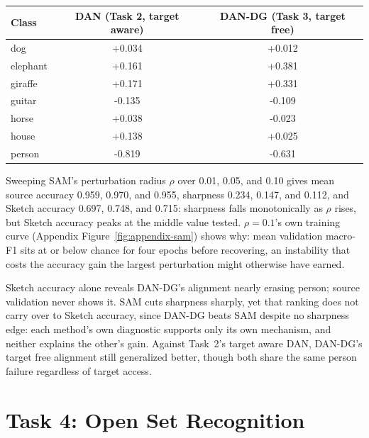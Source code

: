 \documentclass{article}
\begin{document}
\begin{center}
\small
\begin{tabular}{lcc}
  \toprule
  Class & DAN (Task 2, target aware) & DAN-DG (Task 3, target free) \\
  \midrule
  dog      & +0.034 & +0.012 \\
  elephant & +0.161 & +0.381 \\
  giraffe  & +0.171 & +0.331 \\
  guitar   & -0.135 & -0.109 \\
  horse    & +0.038 & -0.023 \\
  house    & +0.138 & +0.025 \\
  person   & -0.819 & -0.631 \\
  \bottomrule
\end{tabular}
\label{tab:crosstask-dan}
\end{center}

Sweeping SAM's perturbation radius $\rho$ over 0.01, 0.05, and 0.10 gives
mean source accuracy 0.959, 0.970, and 0.955, sharpness 0.234, 0.147, and
0.112, and Sketch accuracy 0.697, 0.748, and 0.715: sharpness falls
monotonically as $\rho$ rises, but Sketch accuracy peaks at the middle
value tested. $\rho=0.1$'s own training curve (Appendix
Figure~\ref{fig:appendix-sam}) shows why: mean validation macro-F1 sits at
or below chance for four epochs before recovering, an instability that
costs the accuracy gain the largest perturbation might otherwise have
earned.

Sketch accuracy alone reveals DAN-DG's alignment nearly erasing person;
source validation never shows it. SAM cuts sharpness sharply, yet that
ranking does not carry over to Sketch accuracy, since DAN-DG beats SAM
despite no sharpness edge: each method's own diagnostic supports only its
own mechanism, and neither explains the other's gain. Against Task~2's
target aware DAN, DAN-DG's target free alignment still generalized better,
though both share the
same person failure regardless of target access.

\section{Task 4: Open Set Recognition}
\label{sec:task4}
\end{document}

